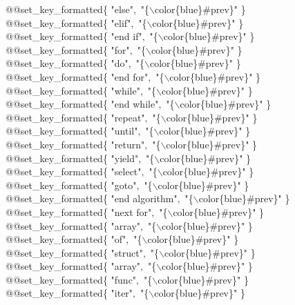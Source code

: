 \tb @@set\_key\_formatted\{ "else"$,$ "\{$\backslash$color\{blue\}\#prev\}" \} \\
\tb @@set\_key\_formatted\{ "elif"$,$ "\{$\backslash$color\{blue\}\#prev\}" \} \\
\tb @@set\_key\_formatted\{ "end if"$,$ "\{$\backslash$color\{blue\}\#prev\}" \} \\
\tb @@set\_key\_formatted\{ "for"$,$ "\{$\backslash$color\{blue\}\#prev\}" \} \\
\tb @@set\_key\_formatted\{ "do"$,$ "\{$\backslash$color\{blue\}\#prev\}" \} \\
\tb @@set\_key\_formatted\{ "end for"$,$ "\{$\backslash$color\{blue\}\#prev\}" \} \\
\tb @@set\_key\_formatted\{ "while"$,$ "\{$\backslash$color\{blue\}\#prev\}" \} \\
\tb @@set\_key\_formatted\{ "end while"$,$ "\{$\backslash$color\{blue\}\#prev\}" \} \\
\tb @@set\_key\_formatted\{ "repeat"$,$ "\{$\backslash$color\{blue\}\#prev\}" \} \\
\tb @@set\_key\_formatted\{ "until"$,$ "\{$\backslash$color\{blue\}\#prev\}" \} \\
\tb @@set\_key\_formatted\{ "return"$,$ "\{$\backslash$color\{blue\}\#prev\}" \} \\
\tb @@set\_key\_formatted\{ "yield"$,$ "\{$\backslash$color\{blue\}\#prev\}" \} \\
\tb @@set\_key\_formatted\{ "select"$,$ "\{$\backslash$color\{blue\}\#prev\}" \} \\
\tb @@set\_key\_formatted\{ "goto"$,$ "\{$\backslash$color\{blue\}\#prev\}" \} \\
\tb @@set\_key\_formatted\{ "end algorithm"$,$ "\{$\backslash$color\{blue\}\#prev\}" \} \\
\tb @@set\_key\_formatted\{ "next for"$,$ "\{$\backslash$color\{blue\}\#prev\}" \} \\
\tb @@set\_key\_formatted\{ "array"$,$ "\{$\backslash$color\{blue\}\#prev\}" \} \\
\tb @@set\_key\_formatted\{ "of"$,$ "\{$\backslash$color\{blue\}\#prev\}" \} \\
\tb @@set\_key\_formatted\{ "struct"$,$ "\{$\backslash$color\{blue\}\#prev\}" \} \\
\tb @@set\_key\_formatted\{ "array"$,$ "\{$\backslash$color\{blue\}\#prev\}" \} \\
\tb @@set\_key\_formatted\{ "func"$,$ "\{$\backslash$color\{blue\}\#prev\}" \} \\
\tb @@set\_key\_formatted\{ "iter"$,$ "\{$\backslash$color\{blue\}\#prev\}" \} \\
